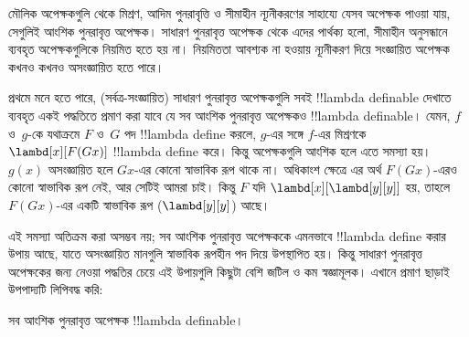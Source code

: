 \documentclass[../../../include/open-logic-section]{subfiles}
\begin{document}

মৌলিক অপেক্ষকগুলি থেকে মিশ্রণ, আদিম পুনরাবৃত্তি ও সীমাহীন ন্যূনীকরণের
সাহায্যে যেসব অপেক্ষক পাওয়া যায়, সেগুলিই আংশিক পুনরাবৃত্ত অপেক্ষক।
সাধারণ পুনরাবৃত্ত অপেক্ষক থেকে এদের পার্থক্য হলো, সীমাহীন অনুসন্ধানে
ব্যবহৃত অপেক্ষকগুলিকে নিয়মিত হতে হয় না। নিয়মিততা আবশ্যক না হওয়ায়
ন্যূনীকরণ দিয়ে সংজ্ঞায়িত অপেক্ষক কখনও কখনও অসংজ্ঞায়িত হতে পারে।

প্রথমে মনে হতে পারে, (সর্বত্র-সংজ্ঞায়িত) সাধারণ পুনরাবৃত্ত অপেক্ষকগুলি
সবই !!{lambda definable} দেখাতে ব্যবহৃত একই পদ্ধতিতে প্রমাণ করা যাবে যে
সব আংশিক পুনরাবৃত্ত অপেক্ষকও !!{lambda definable}। যেমন, $f$ ও~$g$-কে
যথাক্রমে $F$ ও~$G$ পদ !!{lambda define} করলে, $g$-এর সঙ্গে $f$-এর
মিশ্রণকে $\lambd[x][F (G x)]$ !!{lambda define} করে। কিন্তু অপেক্ষকগুলি
আংশিক হলে এতে সমস্যা হয়। $g(x)$ অসংজ্ঞায়িত হলে $G x$-এর কোনো স্বাভাবিক
রূপ থাকে না। অধিকাংশ ক্ষেত্রে এর অর্থ $F (G x)$-এরও কোনো স্বাভাবিক রূপ
নেই, আর সেটিই আমরা চাই। কিন্তু $F$ যদি $\lambd[x][\lambd[y][y]]$ হয়,
তাহলে $F (G x)$-এর একটি স্বাভাবিক রূপ ($\lambd[y][y]$) আছে।

এই সমস্যা অতিক্রম করা অসম্ভব নয়; সব আংশিক পুনরাবৃত্ত অপেক্ষককে এমনভাবে
!!{lambda define} করার উপায় আছে, যাতে অসংজ্ঞায়িত মানগুলি স্বাভাবিক রূপহীন
পদ দিয়ে উপস্থাপিত হয়। কিন্তু সাধারণ পুনরাবৃত্ত অপেক্ষকের জন্য নেওয়া
পদ্ধতির চেয়ে এই উপায়গুলি কিছুটা বেশি জটিল ও কম স্বজ্ঞামূলক। এখানে
প্রমাণ ছাড়াই উপপাদ্যটি লিপিবদ্ধ করি:

\begin{thm}
  সব আংশিক পুনরাবৃত্ত অপেক্ষক !!{lambda definable}।
\end{thm}
\end{document}
